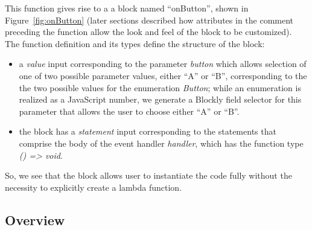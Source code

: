 This function gives rise to a 
a block named ``onButton'', shown in Figure~\ref{fig:onButton}
(later sections described how attributes in the comment preceding
the function allow the look and feel of the block to be customized).
The function definition and its types define the structure of the
block:
\begin{itemize}
\item  a \emph{value} input corresponding to the parameter
\emph{button} which allows selection of one of two 
possible parameter values, either ``A'' or ``B'', corresponding to the
the two possible values for the enumeration \emph{Button};
while an enumeration is realized as a JavaScript number, we
generate a Blockly field selector for this parameter that allows
the user to choose either ``A'' or ``B''.
\item the block has a \emph{statement} input corresponding to the
statements that comprise the body of the event handler \emph{handler},
which has the function type \emph{() => void}. 
\end{itemize}
So, we see that the block allows user to instantiate the code fully without
the necessity to explicitly create a lambda function.

\subsection{Overview}






